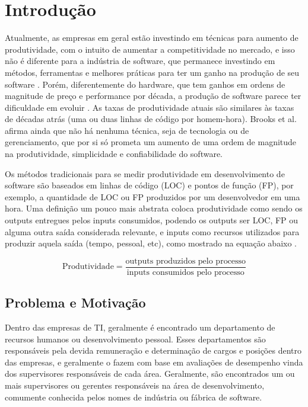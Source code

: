 \chapter[Introdução]{Introdução}

Atualmente, as empresas em geral estão investindo em técnicas para aumento de produtividade, com o intuito de aumentar a competitividade no mercado, e isso não é diferente para a indústria de software, que permanece investindo em métodos, ferramentas e melhores práticas para ter um ganho na produção de seu software \cite{deBarrosSampaio2010}.
Porém, diferentemente do hardware, que tem ganhos em ordens de magnitude de preço e performance por década, a produção de software parece ter dificuldade em evoluir \cite{Boehm1987}. As taxas de produtividade atuais são similares às taxas de décadas atrás (uma ou duas linhas de código por homem-hora)\cite{Boehm1987}. Brooks et al. \cite{BrooksJr1987} afirma ainda que não há nenhuma técnica, seja de tecnologia ou de gerenciamento, que por si só prometa um aumento de uma ordem de magnitude na produtividade, simplicidade e confiabilidade do software.

Os métodos tradicionais para se medir produtividade em desenvolvimento de software são baseados em linhas de código (\acs{LOC}) e pontos de função (\acs{FP})\cite{Wagner2008}, por exemplo, a quantidade de LOC ou FP produzidos por um desenvolvedor em uma hora. Uma definição um pouco mais abstrata coloca produtividade como sendo os outputs entregues pelos inputs consumidos, podendo os outputs ser LOC, FP ou alguma outra saída considerada relevante, e inputs como recursos utilizados para produzir aquela saída (tempo, pessoal, etc), como mostrado na equação abaixo \cite{Boehm1987, Walston1977, Yu1991}.

\begin{equation}
\text{Produtividade} = \dfrac{\text{outputs produzidos pelo processo}}{\text{inputs consumidos pelo processo}}
\end{equation} 

\section{Problema e Motivação}\label{secao1.2}
Dentro das empresas de TI, geralmente é encontrado um departamento de recursos humanos ou desenvolvimento pessoal. Esses departamentos são responsáveis pela devida remuneração e determinação de cargos e posições dentro das empresas, e geralmente o fazem com base em avaliações de desempenho vinda dos supervisores responsáveis de cada área. Geralmente, são encontrados um ou mais supervisores ou gerentes responsáveis na área de desenvolvimento, comumente conhecida pelos nomes de indústria ou fábrica de software.

